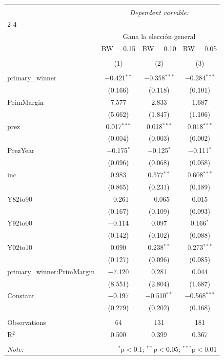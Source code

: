 
\begin{table}[!htbp] \centering 
  \caption{} 
  \label{} 
\begin{tabular}{@{\extracolsep{5pt}}lccc} 
\\[-1.8ex]\hline 
\hline \\[-1.8ex] 
 & \multicolumn{3}{c}{\textit{Dependent variable:}} \\ 
\cline{2-4} 
\\[-1.8ex] & \multicolumn{3}{c}{Gana la elección general} \\ 
 & BW = 0.15 & BW = 0.10 & BW = 0.05 \\ 
\\[-1.8ex] & (1) & (2) & (3)\\ 
\hline \\[-1.8ex] 
 primary\_winner & $-$0.421$^{**}$ & $-$0.358$^{***}$ & $-$0.284$^{***}$ \\ 
  & (0.166) & (0.118) & (0.101) \\ 
  PrimMargin & 7.577 & 2.833 & 1.687 \\ 
  & (5.662) & (1.847) & (1.106) \\ 
  prez & 0.017$^{***}$ & 0.018$^{***}$ & 0.018$^{***}$ \\ 
  & (0.004) & (0.003) & (0.002) \\ 
  PrezYear & $-$0.175$^{*}$ & $-$0.125$^{*}$ & $-$0.111$^{*}$ \\ 
  & (0.096) & (0.068) & (0.058) \\ 
  inc & 0.983 & 0.577$^{**}$ & 0.608$^{***}$ \\ 
  & (0.865) & (0.231) & (0.189) \\ 
  Y82to90 & $-$0.261 & $-$0.065 & 0.015 \\ 
  & (0.167) & (0.109) & (0.093) \\ 
  Y92to00 & $-$0.114 & 0.097 & 0.166$^{*}$ \\ 
  & (0.142) & (0.102) & (0.088) \\ 
  Y02to10 & 0.090 & 0.238$^{**}$ & 0.273$^{***}$ \\ 
  & (0.127) & (0.096) & (0.085) \\ 
  primary\_winner:PrimMargin & $-$7.120 & 0.281 & 0.044 \\ 
  & (8.551) & (2.804) & (1.687) \\ 
  Constant & $-$0.197 & $-$0.510$^{**}$ & $-$0.568$^{***}$ \\ 
  & (0.279) & (0.202) & (0.168) \\ 
 \hline \\[-1.8ex] 
Observations & 64 & 131 & 181 \\ 
R$^{2}$ & 0.500 & 0.399 & 0.367 \\ 
\hline 
\hline \\[-1.8ex] 
\textit{Note:}  & \multicolumn{3}{r}{$^{*}$p$<$0.1; $^{**}$p$<$0.05; $^{***}$p$<$0.01} \\ 
\end{tabular} 
\end{table} 
